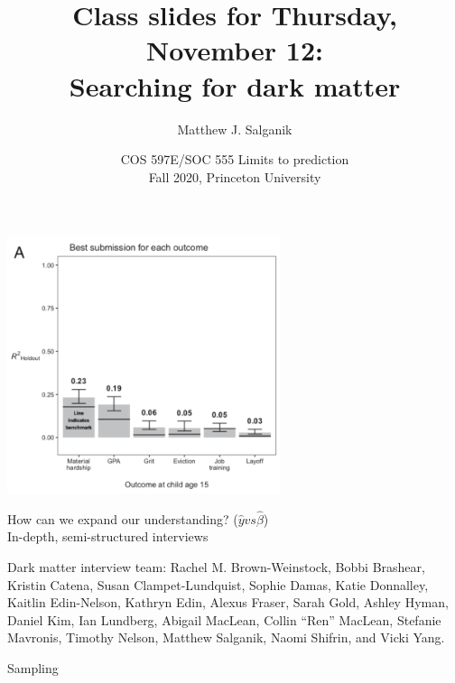 \documentclass[aspectratio=169]{beamer}
\title[]{Class slides for Thursday, November 12:\\Searching for dark matter}
\author[]{Matthew J. Salganik}
\institute[]{}
\date[]{COS 597E/SOC 555 Limits to prediction\\Fall 2020, Princeton University}
\begin{document}
\frame{\titlepage}
\begin{frame}

\begin{center}
\includegraphics[width = 0.6\textwidth]{figures/salganik_measuring_2020_fig2a}
\end{center}

\end{frame}
\begin{frame}

\begin{center}
{\Large How can we expand our understanding? ($\hat{y} vs \hat{\beta}$)}\\ 
\vspace{0.5in}
\pause
{\Large In-depth, semi-structured interviews}
\end{center}

\vfill
Dark matter interview team: Rachel M. Brown-Weinstock, Bobbi Brashear, Kristin Catena, Susan Clampet-Lundquist, Sophie Damas, Katie Donnalley, Kaitlin Edin-Nelson, Kathryn Edin, Alexus Fraser, Sarah Gold, Ashley Hyman, Daniel Kim, Ian Lundberg, Abigail MacLean, Collin ``Ren'' MacLean, Stefanie Mavronis, Timothy Nelson, Matthew Salganik, Naomi Shifrin, and Vicki Yang.
\end{frame}
\begin{frame}

\begin{center}
{\Large Sampling}
\end{center}

\end{frame}
\end{document}
